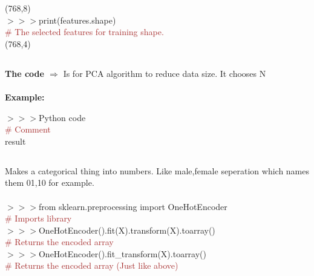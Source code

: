 \documentclass[a4paper,18pt]{article}
\begin{document}
\hspace{14pt} (768,8)\\

$>>>$print(features.shape)\\{\textcolor{brown}{\# The selected features for training shape.}}\\

\hspace{14pt} (768,4)\\


\subsection{\colorbox {matgreen}{\color{white}{\large PCA(n\_components=N)}}}
\textbf{The code $\Rightarrow$} Is for PCA algorithm to reduce data size. It chooses N \\\\
\textbf{Example:\\}

$>>>$Python code\\{\textcolor{brown}{\# Comment}}\\

\hspace{14pt} result\\


\subsection{\colorbox {matgreen}{\color{white}{\large OneHotEncoding}}}

Makes a categorical thing into numbers. Like male,female seperation which names them 01,10 for example.\\\\

$>>>$from sklearn.preprocessing import OneHotEncoder\\{\textcolor{brown}{\# Imports library}}\\

$>>>$OneHotEncoder().fit(X).transform(X).toarray()\\{\textcolor{brown}{\# Returns the encoded array}}\\

$>>>$OneHotEncoder().fit\_transform(X).toarray()\\{\textcolor{brown}{\# Returns the encoded array (Just like above)}}\\
\end{document}

